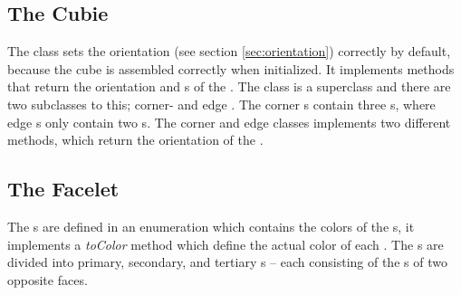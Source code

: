 \subsection{The Cubie}
The \cpiece{} class sets the orientation (see section \ref{sec:orientation}) correctly by default, because the cube is assembled correctly when initialized. 
It implements methods that return the orientation and \facelet{}s of the \cpiece{}. 
The \cubie{} class is a superclass and there are two subclasses to this; corner- and edge \cubie{}. 
The corner \cubie{}s contain three \facelet{}s, where edge \cubie{}s only contain two \facelet{}s.
The corner and edge \cpiece{} classes implements two different methods, which return the orientation of the \cpiece{}. 



\subsection{The Facelet}
The \facelet{}s are defined in an enumeration which contains the colors of the \facelet{}s, it implements a \textit{toColor} method which define the actual color of each \facelet{}.
The \facelet{}s are divided into primary, secondary, and tertiary \facelet{}s -- 
each consisting of the \facelet{}s of two opposite faces. 